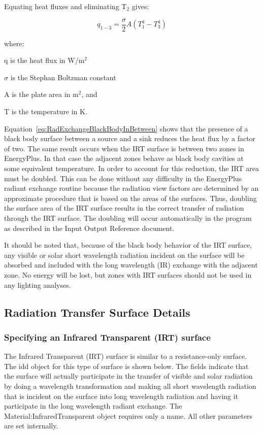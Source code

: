 Equating heat fluxes and eliminating T\(_{2}\) gives:

\begin{equation}
{q_{1 - 3}} = \frac{\sigma }{2}A\left( {T_1^4 - T_3^4} \right)
\label{eq:RadExchangeBlackBodyInBetween}
\end{equation}

where:

q is the heat flux in W/m\(^{2}\)

$\sigma$ is the Stephan Boltzman constant

A is the plate area in m\(^{2}\), and

T is the temperature in K.

Equation~\ref{eq:RadExchangeBlackBodyInBetween} shows that the presence of a black body surface between a source and a sink reduces the heat flux by a factor of two. The same result occurs when the IRT surface is between two zones in EnergyPlus. In that case the adjacent zones behave as black body cavities at some equivalent temperature. In order to account for this reduction, the IRT area must be doubled. This can be done without any difficulty in the EnergyPlus radiant exchange routine because the radiation view factors are determined by an approximate procedure that is based on the areas of the surfaces. Thus, doubling the surface area of the IRT surface results in the correct transfer of radiation through the IRT surface. The doubling will occur automatically in the program as described in the Input Output Reference document.

It should be noted that, because of the black body behavior of the IRT surface, any visible or solar short wavelength radiation incident on the surface will be absorbed and included with the long wavelength (IR) exchange with the adjacent zone. No energy will be lost, but zones with IRT surfaces should not be used in any lighting analyses.

\subsection{Radiation Transfer Surface Details}\label{radiation-transfer-surface-details}

\subsubsection{Specifying an Infrared Transparent (IRT) surface}\label{specifying-an-infrared-transparent-irt-surface}

The Infrared Transparent (IRT) surface is similar to a resistance-only surface. The idd object for this type of surface is shown below. The fields indicate that the surface will actually participate in the transfer of visible and solar radiation by doing a wavelength transformation and making all short wavelength radiation that is incident on the surface into long wavelength radiation and having it participate in the long wavelength radiant exchange. The Material:InfraredTransparent object requires only a name. All other parameters are set internally.

